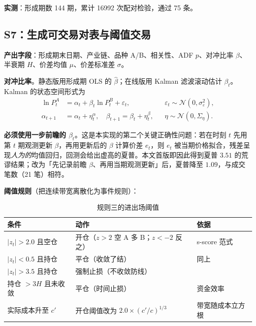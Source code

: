\textbf{实测}：形成期数 144 期，累计 16992 次配对检验，通过 75 条。

\subsection{S7：生成可交易对表与阈值交易}

\textbf{产出字段}：形成期末日期、产业链、品种 A/B、相关性、ADF $p$、对冲比率 $\beta$、半衰期 $H$、价差均值 $\mu$、价差标准差 $\sigma$。

\textbf{对冲比率}。静态版用形成期 OLS 的 $\hat\beta$；在线版用 Kalman 滤波滚动估计 $\beta_t$\cite{elliott2005}。Kalman 的状态空间形式为
\begin{equation}
\begin{aligned}
\ln P^A_t&=\alpha_t+\beta_t\ln P^B_t+\varepsilon_t, &&\varepsilon_t\sim\mathcal N(0,\sigma_\varepsilon^2),\\
\alpha_{t+1}&=\alpha_t+\eta^{\alpha}_t,\quad \beta_{t+1}=\beta_t+\eta^{\beta}_t, &&\eta\sim\mathcal N(0,\Sigma_\eta).
\end{aligned}
\end{equation}

\textbf{必须使用一步前瞻的 $\beta_t$}。这是本实现的第二个关键正确性问题：若在时刻 $t$ 先用第 $t$ 期观测更新 $\beta$，再用更新后的 $\beta$ 计算价差 $e_t$，则 $e_t$ 被当期价格拟合，残差呈现\emph{人为的}均值回归，回测会给出虚高的夏普。本文首版即因此得到夏普 $3.51$ 的荒谬结果；改为「先记录前瞻 $\beta$、再用当期观测更新」后，夏普降至 $1.09$，与成交笔数（21 笔）相符。

\textbf{阈值规则}（把连续带宽离散化为事件规则）：

\begin{table}[htbp]
\centering\footnotesize
\caption{规则三的进出场阈值}\label{tab:pairband}
\begin{tabular}{@{}>{\raggedright\arraybackslash}p{3.0cm}>{\raggedright\arraybackslash}p{5.4cm}>{\raggedright\arraybackslash}p{5.5cm}@{}}
\toprule
\textbf{条件} & \textbf{动作} & \textbf{依据} \\
\midrule
$|z_t|>2.0$ 且空仓 & 开仓（$z>2$ 空 A 多 B；$z<-2$ 反之） & s-score 范式\cite{avellaneda2010} \\
$|z_t|<0.5$ 且持仓 & 平仓（收敛了结） & 同上 \\
$|z_t|>3.5$ 且持仓 & 强制止损（不收敛防线） & \cite{leungli2015} \\
持仓 $>3H$ 且未收敛 & 平仓（时间止损） & 资金效率 \\
实际成本升至 $c'$ & 开仓阈值改为 $2.0\times(c'/c)^{1/3}$ & 带宽随成本立方根\cite{martin2011} \\
\bottomrule
\end{tabular}
\end{table}

